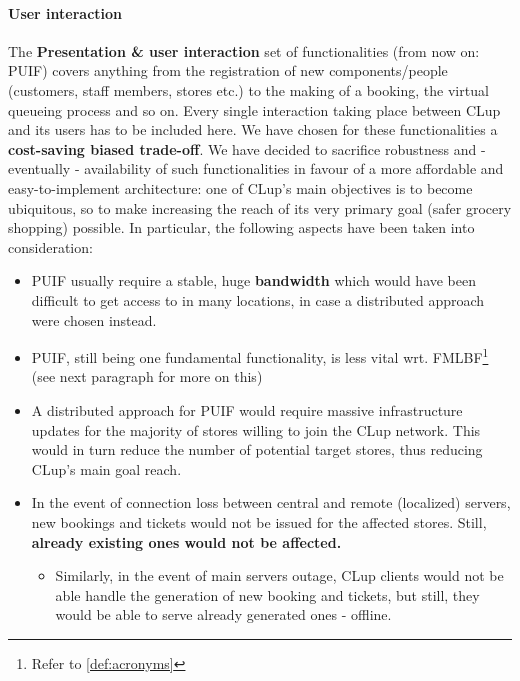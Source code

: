 \paragraph{User interaction}
The \textbf{Presentation \& user interaction} set of functionalities (from now on: PUIF) covers anything from the registration of new components/people (customers, staff members, stores etc.) to the making of a booking, the virtual queueing process and so on. Every single interaction taking place between CLup and its users has to be included here. \newline
We have chosen for these functionalities a \textbf{cost-saving biased trade-off}. We have decided to sacrifice robustness and - eventually - availability of such functionalities in favour of a more affordable and easy-to-implement architecture: one of CLup's main objectives is to become ubiquitous, so to make  increasing the reach of its very primary goal (safer grocery shopping) possible.\newline
In particular, the following aspects have been taken into consideration:
\begin{itemize}
    \item PUIF usually require a stable, huge \textbf{bandwidth} which would have been difficult to get access to in many locations, in case a distributed approach were chosen instead.
    \item PUIF, still being one fundamental functionality, is less vital wrt. FMLBF\footnote{Refer to \ref{def:acronyms}} (see next paragraph for more on this)
    \item A distributed approach for PUIF would require massive infrastructure updates for the majority of stores willing to join the CLup network. This would in turn reduce the number of potential target stores, thus reducing CLup's main goal reach.
    \item In the event of connection loss between central and remote (localized) servers, new bookings and tickets would not be issued for the affected stores. Still, \textbf{already existing ones would not be affected.}
    \begin{itemize}
        \item Similarly, in the event of main servers outage, CLup clients would not be able handle the generation of new booking and tickets, but still, they would be able to serve already generated ones - offline.
    \end{itemize}
\end{itemize}

